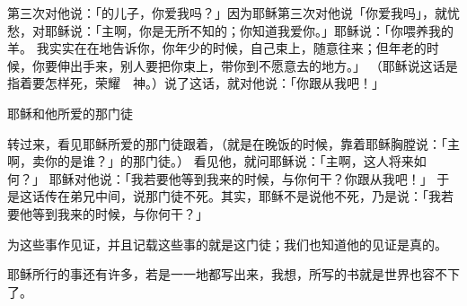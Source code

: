 {第三次对他说：「{}的儿子{}，你爱我吗？」{}因为耶稣第三次对他说「你爱我吗」，就忧愁，对耶稣说：「主啊，你是无所不知的；你知道我爱你。」耶稣说：「你喂养我的羊。
我实实在在地告诉你，你年少的时候，自己束上{}，随意往来；但年老的时候，你要伸出手来，别人要把你束上，带你到不愿意去的地方。」
（耶稣说这话是指着{}要怎样死，荣耀　神。）说了这话，就对他说：「你跟从我吧！」
\par }{\SH 耶稣和他所爱的那门徒
\par }{\PP {}转过来，看见耶稣所爱的那门徒跟着，（就是在晚饭的时候，靠着耶稣胸膛说：「主啊，卖你的是谁？」的那门徒。）
看见他，就问耶稣说：「主啊，这人将来如何？」
耶稣对他说：「我若要他等到我来的时候，与你何干？你跟从我吧！」
于是这话传在弟兄中间，说那门徒不死。其实，耶稣不是说他不死，乃是说：「我若要他等到我来的时候，与你何干？」
\par }{\PP {}为这些事作见证，并且记载这些事的就是这门徒；我们也知道他的见证是真的。
\par }{\PP {}耶稣所行的事还有许多，若是一一地都写出来，我想，所写的书就是世界也容不下了。
\par }